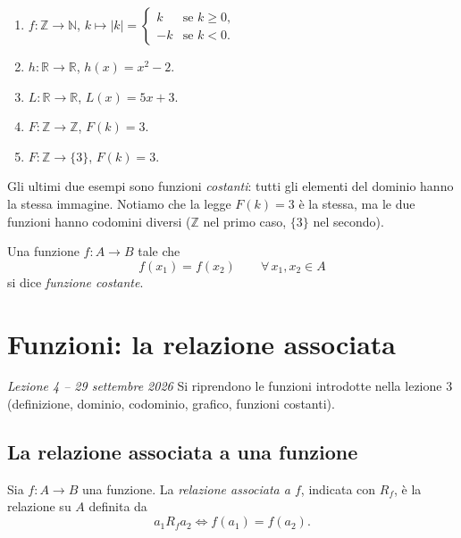 \documentclass[11pt,a4paper]{article}
\begin{document}
\begin{esempio}
\begin{enumerate}
    \item $f : \mathbb{Z} \to \mathbb{N}$, \quad
          $k \mapsto |k| =
          \begin{cases}
            k & \text{se } k \geq 0, \\
            -k & \text{se } k < 0.
          \end{cases}$

    \item $h : \mathbb{R} \to \mathbb{R}$, \quad $h(x) = x^2 - 2$.

    \item $L : \mathbb{R} \to \mathbb{R}$, \quad $L(x) = 5x + 3$.

    \item $F : \mathbb{Z} \to \mathbb{Z}$, \quad $F(k) = 3$.

    \item $F : \mathbb{Z} \to \{3\}$, \quad $F(k) = 3$.
\end{enumerate}
\end{esempio}

Gli ultimi due esempi sono funzioni \emph{costanti}: tutti gli elementi del
dominio hanno la stessa immagine. Notiamo che la legge $F(k) = 3$ è la
stessa, ma le due funzioni hanno codomini diversi ($\mathbb{Z}$ nel primo
caso, $\{3\}$ nel secondo).

\begin{definizione}
Una funzione $f : A \to B$ tale che
\[
f(x_1) = f(x_2) \qquad \forall\, x_1, x_2 \in A
\]
si dice \emph{funzione costante}.
\end{definizione}

\section[Funzioni: la relazione associata (Lezione 4 -- 29 settembre 2026)]{Funzioni: la relazione associata}
\noindent\emph{Lezione 4 -- 29 settembre 2026}
Si riprendono le funzioni introdotte nella lezione 3 (definizione, dominio, codominio, grafico, funzioni costanti).

\subsection{La relazione associata a una funzione}

\begin{definizione}
Sia $f : A \to B$ una funzione. La \emph{relazione associata a $f$}, indicata
con $R_f$, è la relazione su $A$ definita da
\[
a_1 \mathrel{R_f} a_2 \iff f(a_1) = f(a_2).
\]
\end{definizione}
\end{document}
